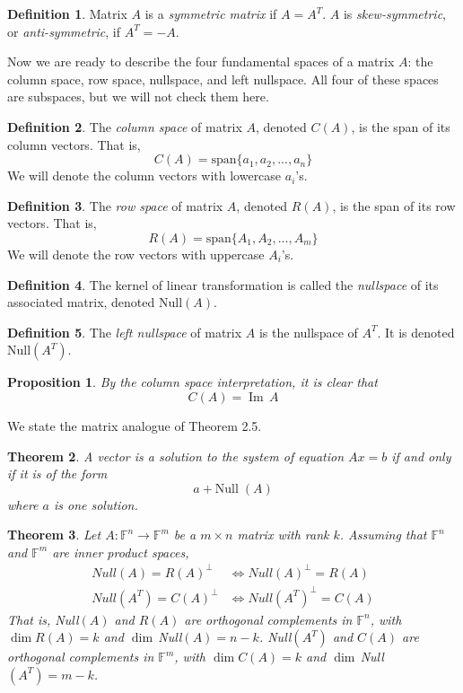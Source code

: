 \documentclass{article}
\DeclareMathOperator{\im}{Im}
\newtheorem{theorem}{Theorem}[section]
\newtheorem{proposition}[theorem]{Proposition}
\theoremstyle{remark}
\theoremstyle{definition}
\newtheorem{definition}{Definition}[section]
\begin{document}
\begin{definition}
Matrix $A$ is a \textit{symmetric matrix} if $A = A^T$. $A$ is \textit{skew-symmetric}, or \textit{anti-symmetric}, if $A^T = - A$. 
\end{definition}

Now we are ready to describe the four fundamental spaces of a matrix $A$: the column space, row space, nullspace, and left nullspace. All four of these spaces are subspaces, but we will not check them here. 

\begin{definition}
The \textit{column space} of matrix $A$, denoted $C(A)$, is the span of its column vectors. That is, 
\[C(A) = \text{span}\{ a_1, a_2, ..., a_n\}\]
We will denote the column vectors with lowercase $a_i$'s.
\end{definition}

\begin{definition}
The \textit{row space} of matrix $A$, denoted $R(A)$, is the span of its row vectors. That is, 
\[R(A) = \text{span}\{ A_1, A_2, ..., A_m\}\]
We will denote the row vectors with uppercase $A_i$'s. 
\end{definition}

\begin{definition}
The kernel of linear transformation is called the \textit{nullspace} of its associated matrix, denoted Null$(A)$. 
\end{definition}

\begin{definition}
The \textit{left nullspace} of matrix $A$ is the nullspace of $A^T$. It is denoted Null$(A^T)$. 
\end{definition}

\begin{proposition}
By the column space interpretation, it is clear that
\[C(A) = \im \, A\]
\end{proposition}

We state the matrix analogue of Theorem 2.5. 
\begin{theorem}
A vector is a solution to the system of equation $A x = b$ if and only if it is of the form 
\[ a + \text{Null}\; (A)\]
where $a$ is one solution. 
\end{theorem}

\begin{theorem}
Let $A: \mathbb{F}^n \longrightarrow \mathbb{F}^m$ be a $m \times n$ matrix with rank $k$. Assuming that $\mathbb{F}^n$ and $\mathbb{F}^m$ are inner product spaces,  
\begin{align}
    Null(A) = R(A)^\perp &\iff Null(A)^\perp = R(A) \\
    Null(A^T) = C(A)^\perp &\iff Null(A^T)^\perp = C(A)
\end{align}
That is, Null$(A)$ and $R(A)$ are orthogonal complements in $\mathbb{F}^n$, with $\dim R(A) = k$ and $\dim\,$Null$(A) = n - k$. Null$(A^T)$ and $C(A)$ are orthogonal complements in $\mathbb{F}^m$, with $\dim C(A) = k$ and $\dim \,$Null$(A^T) = m - k$. 
\end{theorem}
\end{document}
